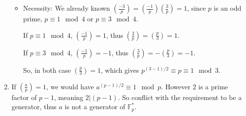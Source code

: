 \documentclass[11pt,a4paper]{article}
\begin{document}
\begin{enumerate}
\begin{itemize}
\item Necessity: We already known $\left(\frac{-3}{p}\right) = \left(\frac{-1}{p}\right)\left(\frac{3}{p}\right) = 1$, since $p$ is an odd prime, $p \equiv 1 \mod 4$ or $p \equiv 3 \mod 4$.
\par If $p \equiv 1 \mod 4$, $\left(\frac{-1}{p}\right) = 1$, thus $\left(\frac{3}{p}\right) = \left(\frac{p}{3}\right) = 1$.
\par If $p \equiv 3 \mod 4$, $\left(\frac{-1}{p}\right) = -1$, thus $\left(\frac{3}{p}\right) = -\left(\frac{p}{3}\right) = -1$.
\par So, in both case $\left(\frac{p}{3}\right) = 1$, which gives $p^{(3-1)/2} \equiv p \equiv 1 \mod 3$.
\end{itemize}

\item If $\left(\frac{a}{p}\right) = 1$, we would have $a^{(p-1)/2} \equiv 1 \mod p$. However $2$ is a prime factor of $p-1$, meaning $2 \vert (p-1)$. So conflict with the requirement to be a generator, thus $a$ is not a generator of $\mathbb{F}_{p}^{*}$.
\end{enumerate}


\newpage
\end{document}
